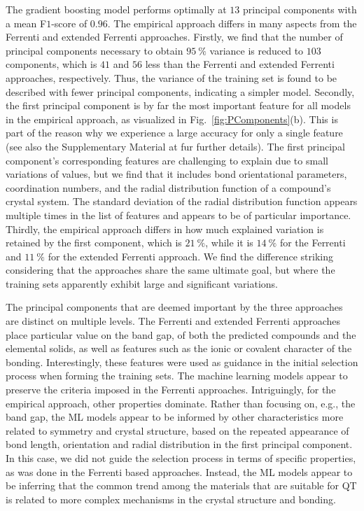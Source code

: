 \documentclass[superscriptaddress,unsortedaddress,
 amsmath,amssymb,
 aps,
]{revtex4-2}
\begin{document}
The gradient boosting model performs optimally at $13$ principal components with a mean F$1$-score of $0.96$. 
The empirical approach differs in many aspects from the Ferrenti and extended Ferrenti approaches. 
Firstly, we find that the number of principal components necessary to obtain $95 \ \%$ variance is reduced to $103$ components, which is $41$ and $56$ less than the Ferrenti and extended Ferrenti approaches, respectively. Thus, the variance of the training set is found to be described with fewer principal components, indicating a simpler model.   
Secondly, the first principal component is by far the most important feature for all models in the empirical approach, as visualized in Fig.~\ref{fig:PComponents}(b). 
This is part of the reason why we experience a large accuracy for only a single feature (see also the Supplementary Material at \cite{supplementary} fur further details). The first principal component's corresponding features are challenging to explain due to small variations of values, but we find that it includes bond orientational parameters, coordination numbers, and the radial distribution function of a compound's crystal system. 
The standard deviation of the radial distribution function appears multiple times in the list of features and appears to be of particular importance. 
Thirdly, the empirical approach differs in how much explained variation is retained by the first component, which is $21 \ \%$, while it is $14 \ \%$ for the Ferrenti  and $11 \ \%$ for the extended Ferrenti approach. We find the difference striking considering that the approaches share the same ultimate goal, but where the training sets apparently exhibit large and significant variations. 

The principal components that are deemed important by the three approaches are distinct on multiple levels. The Ferrenti and extended Ferrenti approaches place particular value on the band gap, of both the predicted compounds and the elemental solids, as well as features such as the ionic or covalent character of the bonding. Interestingly, these features were used as guidance in the initial selection process when forming the training sets. The machine learning models appear to preserve the criteria imposed in the Ferrenti approaches. Intriguingly, for the empirical approach, other properties dominate. Rather than focusing on, e.g., the band gap, the ML models appear to be informed by other characteristics more related to symmetry and crystal structure, based on the repeated appearance of bond length, orientation and radial distribution in the first principal component. In this case, we did not guide the selection process in terms of specific properties, as was done in the Ferrenti based approaches. Instead, the ML models appear to be inferring that the common trend among the materials that are suitable for QT is related to more complex mechanisms in the crystal structure and bonding. 
\end{document}
